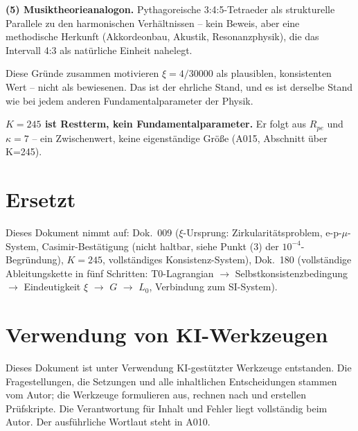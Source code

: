\textbf{(5) Musiktheorieanalogon.} Pythagoreische 3:4:5-Tetraeder als
strukturelle Parallele zu den harmonischen Verhältnissen -- kein Beweis,
aber eine methodische Herkunft (Akkordeonbau, Akustik, Resonanzphysik),
die das Intervall 4:3 als natürliche Einheit nahelegt.

Diese Gründe zusammen motivieren $\xi=4/30000$ als plausiblen, konsistenten
Wert -- nicht als bewiesenen. Das ist der ehrliche Stand, und es ist derselbe
Stand wie bei jedem anderen Fundamentalparameter der Physik.

\textbf{$K=245$ ist Restterm, kein Fundamentalparameter.} Er folgt aus $R_{pe}$
und $\kappa=7$ -- ein Zwischenwert, keine eigenständige Größe (A015, Abschnitt
über K=245).

\section{Ersetzt}

Dieses Dokument nimmt auf: Dok.~009 ($\xi$-Ursprung: Zirkularitätsproblem,
e-p-$\mu$-System, Casimir-Bestätigung (nicht haltbar, siehe Punkt (3) der $10^{-4}$-Begründung), $K=245$, vollständiges Konsistenz-System),
Dok.~180 (vollständige Ableitungskette in fünf Schritten: T0-Lagrangian
$\to$ Selbstkonsistenzbedingung $\to$ Eindeutigkeit $\xi$ $\to$ $G$ $\to$ $L_0$,
Verbindung zum SI-System).

\section{Verwendung von KI-Werkzeugen}

Dieses Dokument ist unter Verwendung KI-gestützter Werkzeuge entstanden. Die
Fragestellungen, die Setzungen und alle inhaltlichen Entscheidungen stammen vom
Autor; die Werkzeuge formulieren aus, rechnen nach und erstellen Prüfskripte.
Die Verantwortung für Inhalt und Fehler liegt vollständig beim Autor. Der
ausführliche Wortlaut steht in A010.
